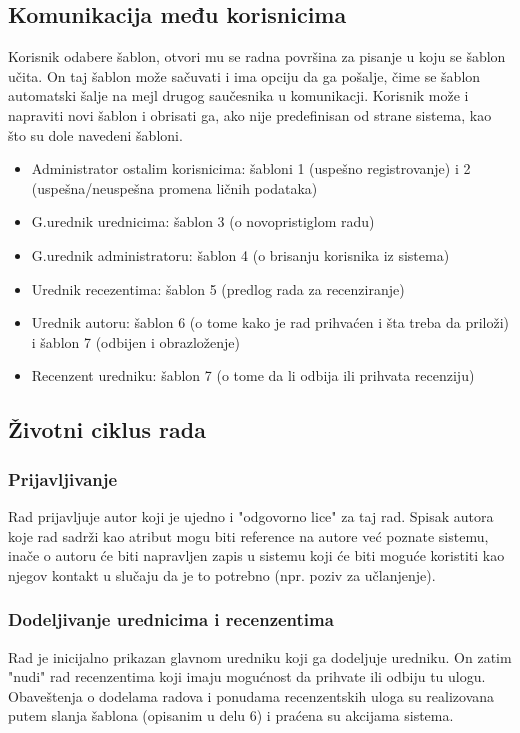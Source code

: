 \documentclass[a4paper]{article}
\begin{document}
\subsection{Komunikacija među korisnicima}
Korisnik odabere šablon, otvori mu se radna površina za pisanje u koju se šablon učita. On taj šablon može sačuvati i ima opciju da ga pošalje, čime se šablon automatski šalje na mejl drugog saučesnika u komunikacji. Korisnik može i napraviti novi šablon i obrisati ga, ako nije predefinisan od strane sistema, kao što su dole navedeni šabloni.
\begin{itemize}
\item Administrator ostalim korisnicima: šabloni 1 (uspešno registrovanje) i 2 (uspešna/neuspešna promena ličnih podataka)
\item G.urednik urednicima: šablon 3 (o novopristiglom radu)
\item G.urednik administratoru: šablon 4 (o brisanju korisnika iz sistema)
\item Urednik recezentima: šablon 5 (predlog rada za recenziranje)
\item Urednik autoru: šablon 6 (o tome kako je rad prihvaćen i šta treba da priloži) i  šablon 7 (odbijen i obrazloženje)
\item Recenzent uredniku: šablon 7 (o tome da li odbija ili prihvata recenziju)
\end{itemize}

\subsection{Životni ciklus rada}
\subsubsection{Prijavljivanje}
Rad prijavljuje autor koji je ujedno i "odgovorno lice" za taj rad. Spisak autora koje rad sadrži kao atribut mogu biti reference na autore već poznate sistemu, inače o autoru će biti napravljen zapis u sistemu koji će biti moguće koristiti kao njegov kontakt u slučaju da je to potrebno (npr. poziv za učlanjenje).
\subsubsection{Dodeljivanje urednicima i recenzentima}
Rad je inicijalno prikazan glavnom uredniku koji ga dodeljuje uredniku. On zatim "nudi" rad recenzentima koji imaju mogućnost da prihvate ili odbiju tu ulogu. Obaveštenja o dodelama radova i ponudama recenzentskih uloga su realizovana putem slanja šablona (opisanim u delu 6) i praćena su akcijama sistema.
\end{document}
